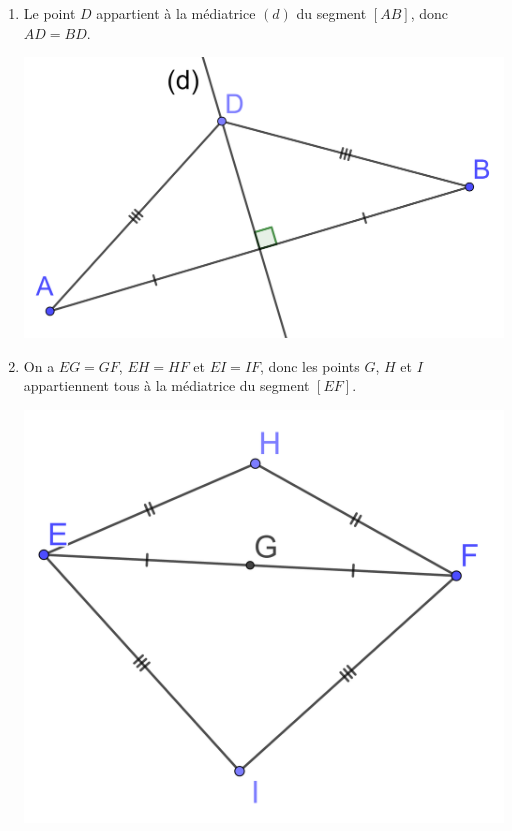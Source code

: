 \documentclass[12pt,a4paper]{article}
\begin{document}
\begin{myexs}
	\begin{multicols}{2}
		
		\begin{enumerate}
			
		
		\item  Le point $D$ appartient à la médiatrice $(d)$ du segment $[AB]$, donc $AD=BD$.
		
		\vspace*{0.5cm}
		\begin{center}
			\includegraphics[scale=0.15]{med2}
		\end{center}
	
		
		\item On a $EG=GF$, $EH=HF$ et $EI=IF$, donc les points $G$, $H$ et $I$ appartiennent tous à la médiatrice du segment $[EF]$.
		
		\begin{center}
			\includegraphics[scale=0.13]{med3}
		\end{center}
	
	\end{enumerate}
	\end{multicols}


	
\end{myexs}
\end{document}
